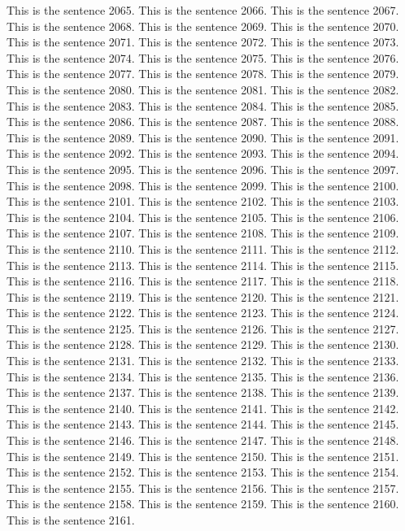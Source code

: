 \documentclass{article}
\begin{document}
This is the sentence 2065.
This is the sentence 2066.
This is the sentence 2067.
This is the sentence 2068.
This is the sentence 2069.
This is the sentence 2070.
This is the sentence 2071.
This is the sentence 2072.
This is the sentence 2073.
This is the sentence 2074.
This is the sentence 2075.
This is the sentence 2076.
This is the sentence 2077.
This is the sentence 2078.
This is the sentence 2079.
This is the sentence 2080.
This is the sentence 2081.
This is the sentence 2082.
This is the sentence 2083.
This is the sentence 2084.
This is the sentence 2085.
This is the sentence 2086.
This is the sentence 2087.
This is the sentence 2088.
This is the sentence 2089.
This is the sentence 2090.
This is the sentence 2091.
This is the sentence 2092.
This is the sentence 2093.
This is the sentence 2094.
This is the sentence 2095.
This is the sentence 2096.
This is the sentence 2097.
This is the sentence 2098.
This is the sentence 2099.
This is the sentence 2100.
This is the sentence 2101.
This is the sentence 2102.
This is the sentence 2103.
This is the sentence 2104.
This is the sentence 2105.
This is the sentence 2106.
This is the sentence 2107.
This is the sentence 2108.
This is the sentence 2109.
This is the sentence 2110.
This is the sentence 2111.
This is the sentence 2112.
This is the sentence 2113.
This is the sentence 2114.
This is the sentence 2115.
This is the sentence 2116.
This is the sentence 2117.
This is the sentence 2118.
This is the sentence 2119.
This is the sentence 2120.
This is the sentence 2121.
This is the sentence 2122.
This is the sentence 2123.
This is the sentence 2124.
This is the sentence 2125.
This is the sentence 2126.
This is the sentence 2127.
This is the sentence 2128.
This is the sentence 2129.
This is the sentence 2130.
This is the sentence 2131.
This is the sentence 2132.
This is the sentence 2133.
This is the sentence 2134.
This is the sentence 2135.
This is the sentence 2136.
This is the sentence 2137.
This is the sentence 2138.
This is the sentence 2139.
This is the sentence 2140.
This is the sentence 2141.
This is the sentence 2142.
This is the sentence 2143.
This is the sentence 2144.
This is the sentence 2145.
This is the sentence 2146.
This is the sentence 2147.
This is the sentence 2148.
This is the sentence 2149.
This is the sentence 2150.
This is the sentence 2151.
This is the sentence 2152.
This is the sentence 2153.
This is the sentence 2154.
This is the sentence 2155.
This is the sentence 2156.
This is the sentence 2157.
This is the sentence 2158.
This is the sentence 2159.
This is the sentence 2160.
This is the sentence 2161.
\end{document}
